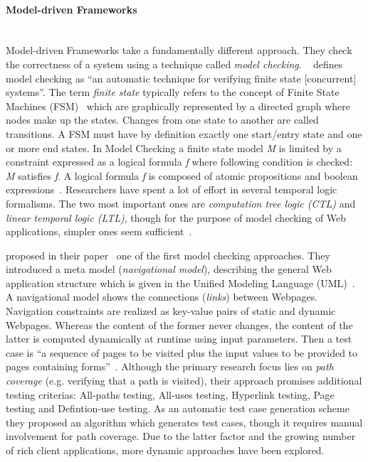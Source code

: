 \documentclass[12pt, notitlepage]{article}
\begin{document}
\paragraph{Model-driven Frameworks} ~\\
Model-driven Frameworks take a fundamentally different approach. They check the correctness of a system using a technique called \textit{model checking}.
~\citet{model-checking} defines model checking as \enquote{an automatic technique for verifying finite state [concurrent] systems}.
The term \textit{finite state} typically refers to the concept of Finite State Machines (FSM)~\cite{finite-state-machines} which are graphically represented by a directed graph where nodes make up the states. Changes from one state to another are called transitions. A FSM must have by definition exactly one start/entry state and one or more end states.  In Model Checking a finite state model \textit{M} is limited by a constraint expressed as a logical formula \textit{f} where
following condition is checked: \textit{M} satisfies \textit{f}. A logical formula \textit{f} is composed of atomic propositions and boolean
expressions~\cite{model-checking}. Researchers have spent a lot of effort in several temporal logic formalisms. The two most important ones are
\textit{computation tree logic (CTL)} and \textit{linear temporal logic (LTL)}, though for the purpose of model checking of Web applications, simpler
ones seem sufficient~\cite{dynamic-testing-web-applications}. 

\citeauthor{web-whiteBox-testing} proposed in their paper~\cite{web-whiteBox-testing} one of the first model checking approaches. They introduced a meta model (\textit{navigational model}), describing the general Web application structure which is given in the Unified Modeling Language (UML)~\cite{uml}.
A navigational model shows the connections (\textit{links}) between Webpages. Navigation constraints are realized as key-value pairs of static and dynamic Webpages. 
Whereas the content of the former never changes, the content of the latter is computed dynamically at runtime using input parameters. Then a test case is
\enquote{a sequence of pages to be visited plus the input values to be provided to pages containing forms}~\cite{web-whiteBox-testing}. Although the primary research focus
lies on \textit{path coverage} (e.g. verifying that a path is visited), their approach promises additional testing criterias: All-paths testing, All-uses testing,
Hyperlink testing, Page testing and Defintion-use testing. As an automatic test case generation scheme they proposed an algorithm  which generates test cases, though it requires manual involvement for path coverage. Due to the latter factor and the growing number of rich client applications, more dynamic approaches have been explored.
\end{document}
